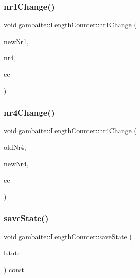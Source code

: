 \mbox{\label{classgambatte_1_1LengthCounter_a6b639f057dab0919908784e350b80228}} 
\subsubsection{\texorpdfstring{nr1\+Change()}{nr1Change()}}
{\footnotesize\ttfamily void gambatte\+::\+Length\+Counter\+::nr1\+Change (\begin{DoxyParamCaption}\item[{unsigned}]{new\+Nr1,  }\item[{unsigned}]{nr4,  }\item[{unsigned}]{cc }\end{DoxyParamCaption})}

\mbox{\label{classgambatte_1_1LengthCounter_a30e1eb09f738c51a75fa5ddd8bf41457}} 
\subsubsection{\texorpdfstring{nr4\+Change()}{nr4Change()}}
{\footnotesize\ttfamily void gambatte\+::\+Length\+Counter\+::nr4\+Change (\begin{DoxyParamCaption}\item[{unsigned}]{old\+Nr4,  }\item[{unsigned}]{new\+Nr4,  }\item[{unsigned}]{cc }\end{DoxyParamCaption})}

\mbox{\label{classgambatte_1_1LengthCounter_a161626ce1c41fe0dc53dfdb40f5644ce}} 
\subsubsection{\texorpdfstring{save\+State()}{saveState()}}
{\footnotesize\ttfamily void gambatte\+::\+Length\+Counter\+::save\+State (\begin{DoxyParamCaption}\item[{\hyperlink{structgambatte_1_1SaveState_1_1SPU_1_1LCounter}{Save\+State\+::\+S\+P\+U\+::\+L\+Counter} \&}]{lstate }\end{DoxyParamCaption}) const}



